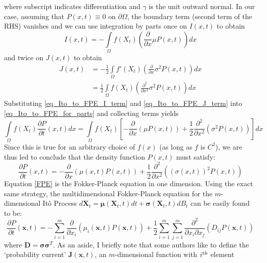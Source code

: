 where subscript indicates differentiation and $\gamma$ is the unit outward normal. In our case, assuming that $P(x,t) \equiv 0$ on $\partial \Omega$, the boundary term (second term of the RHS) vanishes and we can use integration by parts once on $I(x,t)$ to obtain
\begin{equation}
\label{eq_Ito_to_FPE_I_term}
    I(x,t) = - \int\limits_{\Omega}f(X_t)\left(\frac{\partial}{\partial x}\mu P(x,t)\right)dx
\end{equation}
and twice on $J(x,t)$ to obtain
\begin{align}
    J(x,t) &= - \frac{1}{2}\int\limits_{\Omega}f'(X_t)\left(\frac{\partial}{\partial x}\sigma^2 P(x,t)\right)dx\nonumber\\
    &= \frac{1}{2}\int\limits_{\Omega}f(X_t)\left(\frac{\partial^2}{\partial x^2}\sigma^2 P(x,t)\right)dx\label{eq_Ito_to_FPE_J_term}
\end{align}
Substituting \eqref{eq_Ito_to_FPE_I_term} and \eqref{eq_Ito_to_FPE_J_term} into \eqref{eq_Ito_to_FPE_for_parts} and collecting terms yields
\begin{equation*}
    \int\limits_{\Omega}f(X_t)\frac{\partial P}{\partial t}(x,t)dx = \int\limits_{\Omega}f(X_t)\left[-\frac{\partial}{\partial x}(\mu P(x,t)) + \frac{1}{2}\frac{\partial^2}{\partial x^2}(\sigma^2P(x,t))\right]dx
\end{equation*}
Since this is true for an arbitrary choice of $f(x)$ (as long as $f$ is $C^2$), we are thus led to conclude that the density function $P(x,t)$ must satisfy:
\begin{equation}
\label{FPE}
\frac{\partial P}{\partial t}(x,t) =-\frac{\partial}{\partial x}\left(\mu(x,t) P(x,t)\right) + \frac{1}{2}\frac{\partial^2}{\partial x^2}\left((\sigma(x,t))^2P(x,t)\right)
\end{equation}
Equation \eqref{FPE} is the Fokker-Planck equation in one dimension. Using the exact same strategy, the multidimensional Fokker-Planck equation for the $m$-dimensional It\^{o} Process $d\mathbf{X}_t = \boldsymbol{\mu}(\mathbf{X}_t,t)dt + \boldsymbol{\sigma}(\mathbf{X}_t,t)dB_t$ can be easily found to be:
\begin{equation}
\label{app_FPE_ndim}
\frac{\partial P}{\partial t}(\mathbf{x},t) =-\sum\limits_{i=1}^{m}\frac{\partial}{\partial x_i}\left(\mu_i(\mathbf{x},t) P(\mathbf{x},t)\right) + \frac{1}{2}\sum\limits_{i=1}^{m}\sum\limits_{j=1}^{m}\frac{\partial^2}{\partial x_i \partial x_j}\left(D_{ij}P(\mathbf{x},t)\right)
\end{equation}
where $\mathbf{D} = \mathbf{\sigma}\mathbf{\sigma}^T$. As an aside, I briefly note that some authors like to define the `probability current' $\mathbf{J}(\mathbf{x},t)$, an $m$-dimensional function with $i\textsuperscript{th}$ element
